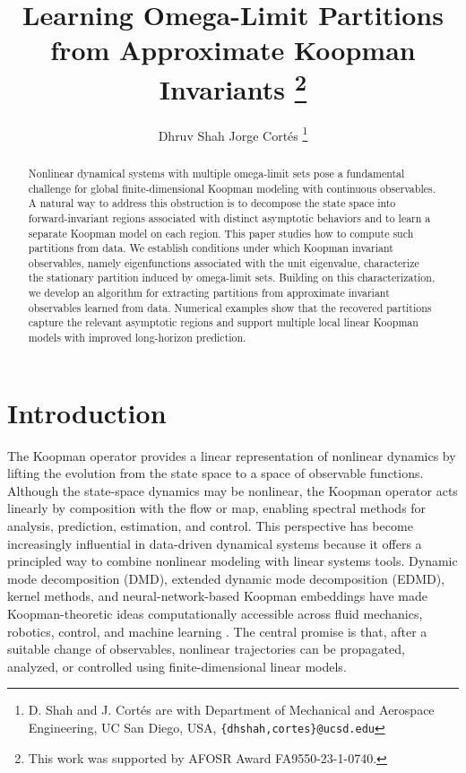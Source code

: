 \documentclass[letterpaper, 10 pt, conference]{ieeeconf}
\begin{document}
\title{\LARGE Learning Omega-Limit Partitions from Approximate Koopman Invariants
\thanks{This work was supported by AFOSR Award FA9550-23-1-0740.}}

\author{Dhruv Shah \quad Jorge Cort\'es \thanks{D. Shah and J. Cort\'es
    are with Department of Mechanical and Aerospace Engineering, UC
    San Diego, USA, {\tt\small \{dhshah,cortes\}@ucsd.edu}}}

\maketitle
\thispagestyle{empty}

\begin{abstract}
Nonlinear dynamical systems with multiple omega-limit sets pose a fundamental challenge for global finite-dimensional Koopman modeling with continuous observables. A natural way to address this obstruction is to decompose the state space into forward-invariant regions associated with distinct asymptotic behaviors and to learn a separate Koopman model on each region. This paper studies how to compute such partitions from data. We establish conditions under which Koopman invariant observables, namely eigenfunctions associated with the unit eigenvalue, characterize the stationary partition induced by omega-limit sets. Building on this characterization, we develop an algorithm for extracting partitions from approximate invariant observables learned from data. Numerical examples show that the recovered partitions capture the relevant asymptotic regions and support multiple local linear Koopman models with improved long-horizon prediction.
\end{abstract}

\section{Introduction}
The Koopman operator provides a linear representation of nonlinear dynamics by lifting the evolution from the state space to a space of observable functions. Although the state-space dynamics may be nonlinear, the Koopman operator acts linearly by composition with the flow or map, enabling spectral methods for analysis, prediction, estimation, and control. This perspective has become increasingly influential in data-driven dynamical systems because it offers a principled way to combine nonlinear modeling with linear systems tools. Dynamic mode decomposition (DMD), extended dynamic mode decomposition (EDMD), kernel methods, and neural-network-based Koopman embeddings have made Koopman-theoretic ideas computationally accessible across fluid mechanics, robotics, control, and machine learning \cite{BOK:31,IM:05,MB-RM-IM:12,MOW-IGK-CWR:15,BL-JNK-SLB:18}. The central promise is that, after a suitable change of observables, nonlinear trajectories can be propagated, analyzed, or controlled using finite-dimensional linear models.
\end{document}
